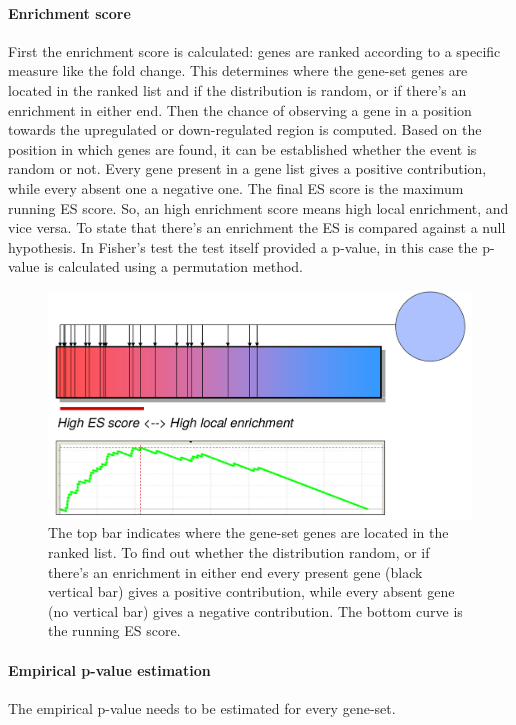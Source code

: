 			\paragraph{Enrichment score}
			First the enrichment score is calculated: genes are ranked according to a specific measure like the fold change.
			This determines where the gene-set genes are located in the ranked list and if the distribution is random, or if there's an enrichment in either end.
			Then the chance of observing a gene in a position towards the upregulated or down-regulated region is computed.
			Based on the position in which genes are found, it can be established whether the event is random or not.
			Every gene present in a gene list gives a positive contribution, while every absent one a negative one.
			The final ES score is the maximum running ES score.
			So, an high enrichment score means high local enrichment, and vice versa.
			To state that there's an enrichment the ES is compared against a null hypothesis.
			In Fisher's test the test itself provided a p-value, in this case the p-value is calculated using a permutation method.

			\begin{figure}[H]
				\centering
				\includegraphics[scale=0.2]{method1}
				\caption{The top bar indicates where the gene-set genes are located in the ranked list. To find out whether the distribution random, or if there's an enrichment in either end every present gene (black vertical bar) gives a positive contribution, while every absent gene (no vertical bar) gives a negative contribution. The bottom curve is the running ES score.}
				\label{fig:method1}
			\end{figure}

			\paragraph{Empirical p-value estimation}
			The empirical p-value needs to be estimated for every gene-set.

